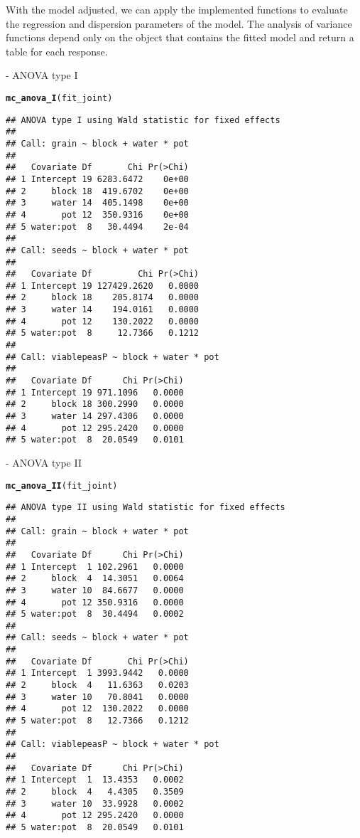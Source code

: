 \documentclass[article]{jss}\usepackage[]{graphicx}\usepackage[]{xcolor}
\makeatletter
\newcommand{\hlstd}[1]{\textcolor[rgb]{0.345,0.345,0.345}{#1}}%
\newcommand{\hlkwd}[1]{\textcolor[rgb]{0.737,0.353,0.396}{\textbf{#1}}}%
\newenvironment{kframe}{%
 \def\at@end@of@kframe{}%
 \ifinner\ifhmode%
  \def\at@end@of@kframe{\end{minipage}}%
  \begin{minipage}{\columnwidth}%
 \fi\fi%
 \def\FrameCommand##1{\hskip\@totalleftmargin \hskip-\fboxsep
 \colorbox{shadecolor}{##1}\hskip-\fboxsep
     \hskip-\linewidth \hskip-\@totalleftmargin \hskip\columnwidth}%
 \MakeFramed {\advance\hsize-\width
   \@totalleftmargin\z@ \linewidth\hsize
   \@setminipage}}%
 {\par\unskip\endMakeFramed%
 \at@end@of@kframe}
\newenvironment{knitrout}{}{} %
\makeatother
\begin{document}
With the model adjusted, we can apply the implemented functions to evaluate the regression and dispersion parameters of the model. The analysis of variance functions depend only on the object that contains the fitted model and return a table for each response.

 - ANOVA type I
 
\begin{knitrout}
\color{fgcolor}\begin{kframe}
\begin{alltt}
\hlkwd{mc_anova_I}\hlstd{(fit_joint)}
\end{alltt}
\begin{verbatim}
## ANOVA type I using Wald statistic for fixed effects
## 
## Call: grain ~ block + water * pot
## 
##   Covariate Df       Chi Pr(>Chi)
## 1 Intercept 19 6283.6472    0e+00
## 2     block 18  419.6702    0e+00
## 3     water 14  405.1498    0e+00
## 4       pot 12  350.9316    0e+00
## 5 water:pot  8   30.4494    2e-04
## 
## Call: seeds ~ block + water * pot
## 
##   Covariate Df         Chi Pr(>Chi)
## 1 Intercept 19 127429.2620   0.0000
## 2     block 18    205.8174   0.0000
## 3     water 14    194.0161   0.0000
## 4       pot 12    130.2022   0.0000
## 5 water:pot  8     12.7366   0.1212
## 
## Call: viablepeasP ~ block + water * pot
## 
##   Covariate Df      Chi Pr(>Chi)
## 1 Intercept 19 971.1096   0.0000
## 2     block 18 300.2990   0.0000
## 3     water 14 297.4306   0.0000
## 4       pot 12 295.2420   0.0000
## 5 water:pot  8  20.0549   0.0101
\end{verbatim}
\end{kframe}
\end{knitrout}

 - ANOVA type II

\begin{knitrout}
\color{fgcolor}\begin{kframe}
\begin{alltt}
\hlkwd{mc_anova_II}\hlstd{(fit_joint)}
\end{alltt}
\begin{verbatim}
## ANOVA type II using Wald statistic for fixed effects
## 
## Call: grain ~ block + water * pot
## 
##   Covariate Df      Chi Pr(>Chi)
## 1 Intercept  1 102.2961   0.0000
## 2     block  4  14.3051   0.0064
## 3     water 10  84.6677   0.0000
## 4       pot 12 350.9316   0.0000
## 5 water:pot  8  30.4494   0.0002
## 
## Call: seeds ~ block + water * pot
## 
##   Covariate Df       Chi Pr(>Chi)
## 1 Intercept  1 3993.9442   0.0000
## 2     block  4   11.6363   0.0203
## 3     water 10   70.8041   0.0000
## 4       pot 12  130.2022   0.0000
## 5 water:pot  8   12.7366   0.1212
## 
## Call: viablepeasP ~ block + water * pot
## 
##   Covariate Df      Chi Pr(>Chi)
## 1 Intercept  1  13.4353   0.0002
## 2     block  4   4.4305   0.3509
## 3     water 10  33.9928   0.0002
## 4       pot 12 295.2420   0.0000
## 5 water:pot  8  20.0549   0.0101
\end{verbatim}
\end{kframe}
\end{knitrout}
\end{document}
